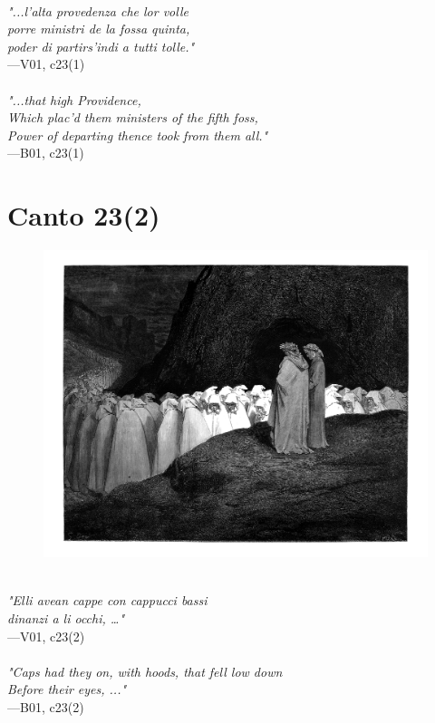 \documentclass[../Dore_vision.tex]{subfiles}
\begin{document}
\begin{center}
\begin{minipage}{0.8\linewidth}
\textit{\\
"...l’alta provedenza che lor volle\\porre ministri de la fossa quinta,\\poder di partirs’indi a tutti tolle."} \\
—V01, c23(1) \\~\\
\textit{"...that high Providence,\\Which plac'd them ministers of the fifth foss,\\Power of departing thence took from them all."} \\
—B01, c23(1)
\end{minipage}
\end{center}

\newpage

\section{Canto 23(2)}

\begin{figure}[ht]
\centering
\includegraphics[height=\figsize]{illustrations/book_1/V01, c23(2).jpg}
\end{figure}

\begin{center}
\begin{minipage}{0.8\linewidth}
\textit{\\
"Elli avean cappe con cappucci bassi\\dinanzi a li occhi, …"} \\
—V01, c23(2) \\~\\
\textit{"Caps had they on, with hoods, that fell low down\\Before their eyes, ..."} \\
—B01, c23(2)
\end{minipage}
\end{center}
\end{document}
